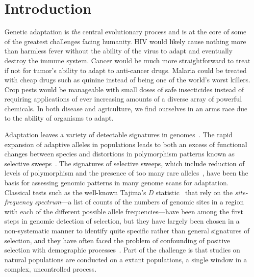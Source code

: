 \section{Introduction}
Genetic adaptation is \emph{the} central evolutionary process and is
at the core of some of the greatest challenges facing humanity. HIV
would likely cause nothing more than harmless fever without the
ability of the virus to adapt and eventually destroy the immune
system. Cancer would be much more straightforward to treat if not for
tumor's ability to adapt to anti-cancer drugs. Malaria could be
treated with cheap drugs such as quinine instead of being one of the
world's worst killers. Crop pests would be manageable with small doses
of safe insecticides instead of requiring applications of ever
increasing amounts of a diverse array of powerful chemicals. In both
disease and agriculture, we find ourselves in an arms race due to the
ability of organisms to adapt.

Adaptation leaves a variety of detectable signatures in
genomes~\cite{Akey09, Kreitman00, MesserAndPetrov13, Nielsen05,
  SabetiEtAl06}. The rapid expansion of adaptive alleles in
populations leads to both an excess of functional changes between
species and distortions in polymorphism patterns known as selective
sweeps~\cite{Nielsen05}. The signatures of selective sweeps, which
include reduction of levels of polymorphism and the presence of too
many rare alleles~\cite{Nielsen05, Przeworski02}, have been the basis
for assessing genomic patterns in many genome scans for
adaptation. Classical tests such as the well-known Tajima's \emph{D}
statistic~\cite{Tajima89} that rely on the \emph{site-frequency
  spectrum}---a list of counts of the numbers of genomic sites in a
region with each of the different possible allele frequencies---have
been among the first steps in genomic detection of selection, but they
have largely been chosen in a non-systematic manner to identify quite
specific rather than general signatures of selection, and they have
often faced the problem of confounding of positive selection with
demographic processes~\cite{PtakAndPrzeworski02, RamosOnsinsAndRojas}.
Part of the challenge is that studies on natural populations are
conducted on a extant populations, a single window in a complex,
uncontrolled process.

